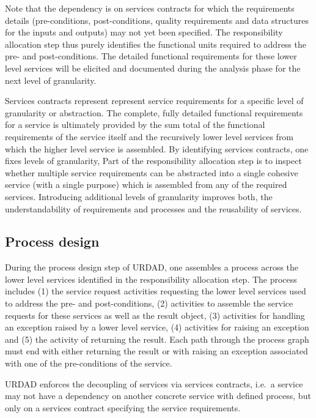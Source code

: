 Note that the dependency is on services contracts for which the requirements details (pre-conditions, post-conditions, quality requirements and data structures for the inputs and outputs) may not yet been specified. The responsibility allocation step thus purely identifies the functional units required to address the pre- and post-conditions. The detailed functional requirements for these lower level services will be elicited and documented during the analysis phase for the next level of granularity.  

Services contracts represent represent service requirements for a specific level of granularity or abstraction. The complete, fully detailed functional requirements for a service is ultimately provided by the sum total of the functional requirements of the service itself and the recursively lower level services from which the higher level service is assembled. By identifying services contracts, one fixes levels of granularity, Part of the responsibility allocation step is to inspect whether multiple service requirements can be abstracted into a single cohesive service (with a single purpose) which is assembled from any of the required services. Introducing additional levels of granularity improves both, the understandability of requirements and processes and the reusability of services.


\subsection{Process design}

During the process design step of URDAD, one assembles a process across the lower level services identified in the responsibility allocation step. The process includes (1) the service request activities requesting the lower level services used to address the pre- and post-conditions, (2) activities to assemble the service requests for these services as well as the result object, (3) activities for handling an exception raised by a lower level service, (4) activities for raising an exception and (5) the activity of returning the result. Each path through the process graph must end with either returning the result or with raising an exception associated with one of the pre-conditions of the service.

URDAD enforces the decoupling of services via services contracts, i.e.\ a service may not have a dependency on another concrete service with defined process, but only on a services contract specifying the service requirements.


